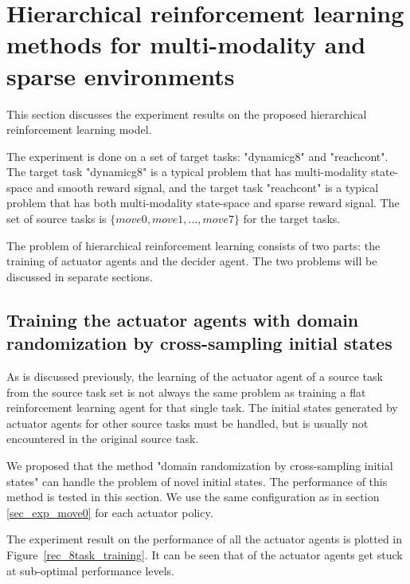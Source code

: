
\section{Hierarchical reinforcement learning methods for multi-modality and sparse environments}
This section discusses the experiment results on the proposed hierarchical reinforcement learning model.

The experiment is done on a set of target tasks: "dynamicg8" and "reachcont". The target task "dynamicg8" is a typical problem that has multi-modality state-space and smooth reward signal, and the target task "reachcont" is a typical problem that has both multi-modality state-space and sparse reward signal. The set of source tasks is  $\{move0, move1, \dots, move7 \}$ for the target tasks.

The problem of hierarchical reinforcement learning consists of two parts: the training of actuator agents and the decider agent. The two problems will be discussed in separate sections.


\subsection{Training the actuator agents with domain randomization by cross-sampling initial states}
As is discussed previously, the learning of the actuator agent of a source task from the source task set is not always the same problem as training a flat reinforcement learning agent for that single task. The initial states generated by actuator agents for other source tasks must be handled, but is usually not encountered in the original source task.

We proposed that the method "domain randomization by cross-sampling initial states" can handle the problem of novel initial states. The performance of this method is tested in this section. We use the same configuration as in section \ref{sec_exp_move0} for each actuator policy.  

The experiment result on the performance of all the actuator agents is plotted in Figure~\ref{rec_8task_training}. It can be seen that of the actuator agents get stuck at sub-optimal performance levels. 

